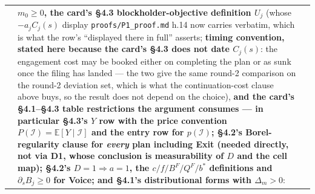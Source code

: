 \documentclass[11pt,a4paper]{article}
\newcommand{\Eop}{\mathbb{E}}
\begin{document}
\begin{longtable}{@{}p{}>{\raggedright\arraybackslash}p{}>{\raggedright\arraybackslash}p{}@{}}
&
\textbf{$m_0\ge0$, the card's \S4.3 blockholder-objective definition $U_j$} (whose
$-a_jC_j(s)$ display \texttt{proofs/P1\_proof.md} h.14 now carries verbatim, which is
what the row's ``displayed there in full'' asserts; \textbf{timing convention, stated
here because the card's \S4.3 does not date $C_j(s)$}: the engagement cost may be booked
either on completing the plan or as sunk once the filing has landed --- the two give the
same round-2 comparison on the round-2 deviation set, which is what the continuation-cost
clause above buys, so the result does not depend on the choice), \textbf{and the card's
\S4.1--\S4.3 table restrictions the argument consumes --- in particular \S4.3's $Y$ row
with the price convention $P(\mathcal I)=\Eop[Y\mid\mathcal I]$ and the entry row for
$p(\mathcal I)$; \S4.2's Borel-regularity clause for \emph{every} plan including Exit
(needed directly, not via D1, whose conclusion is measurability of $D$ and the cell map);
\S4.2's $D=1\Rightarrow a=1$, the $c/f/B^F/Q^F/b^*$ definitions and $\partial_sB_j\ge0$
for Voice; and \S4.1's distributional forms with $\Delta_m>0$}: &
\\


\end{longtable}
\end{document}
